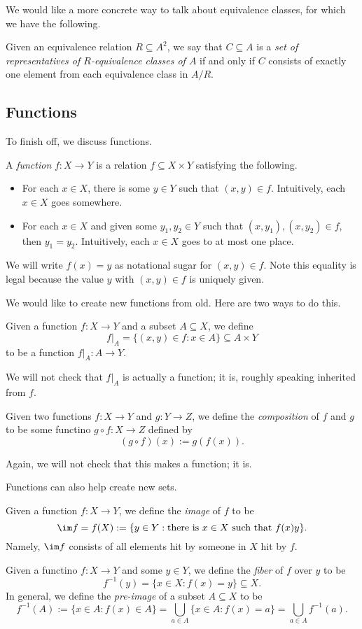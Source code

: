 We would like a more concrete way to talk about equivalence classes, for which we have the following.
\begin{definition}[Representatives]
	Given an equivalence relation $R\subseteq A^2$, we say that $C\subseteq A$ is a \textit{set of representatives of $R$-equivalence classes of $A$} if and only if $C$ consists of exactly one element from each equivalence class in $A/R$.
\end{definition}

\subsection{Functions}
To finish off, we discuss functions.
\begin{definition}[Functions]
	A \textit{function} $f:X\to Y$ is a relation $f\subseteq X\times Y$ satisfying the following.
	\begin{itemize}
		\item For each $x\in X$, there is some $y\in Y$ such that $(x,y)\in f$. Intuitively, each $x\in X$ goes somewhere.
		\item For each $x\in X$ and given some $y_1,y_2\in Y$ such that $(x,y_1),(x,y_2)\in f$, then $y_1=y_2$. Intuitively, each $x\in X$ goes to at most one place.
	\end{itemize}
	We will write $f(x)=y$ as notational sugar for $(x,y)\in f$. Note this equality is legal because the value $y$ with $(x,y)\in f$ is uniquely given.
\end{definition}
We would like to create new functions from old. Here are two ways to do this.
\begin{definition}[Restriction]
	Given a function $f:X\to Y$ and a subset $A\subseteq X$, we define
	\[f|_A=\{(x,y)\in f:x\in A\}\subseteq A\times Y\]
	to be a function $f|_A:A\to Y$.
\end{definition}
We will not check that $f|_A$ is actually a function; it is, roughly speaking inherited from $f$.
\begin{definition}
	Given two functions $f:X\to Y$ and $g:Y\to Z$, we define the \textit{composition} of $f$ and $g$ to be some functino $g\circ f:X\to Z$ defined by
	\[(g\circ f)(x):=g(f(x)).\]
\end{definition}
Again, we will not check that this makes a function; it is.

Functions can also help create new sets.
\begin{definition}[Image]
	Given a function $f:X\to Y$, we define the \textit{image} of $f$ to be
	\[\im f=f(X):=\{y\in Y:\text{there is }x\in X\text{ such that }f(x)y\}.\]
	Namely, $\im f$ consists of all elements hit by someone in $X$ hit by $f$.
\end{definition}
\begin{definition}
	Given a functino $f:X\to Y$ and some $y\in Y$, we define the \textit{fiber} of $f$ over $y$ to be
	\[f^{-1}(y)=\{x\in X:f(x)=y\}\subseteq X.\]
	In general, we define the \textit{pre-image} of a subset $A\subseteq X$ to be
	\[f^{-1}(A):=\{x\in A:f(x)\in A\}=\bigcup_{a\in A}\{x\in A:f(x)=a\}=\bigcup_{a\in A}f^{-1}(a).\]
\end{definition}

